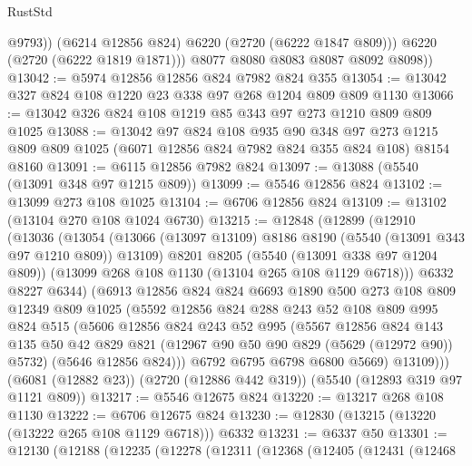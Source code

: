 \begin{lexlean}{RustStd}
\begin{coremodule}
                @9793))
            (@6214 @12856 @824)
            @6220
            (@2720 (@6222 @1847 @809)))
          @6220
          (@2720 (@6222 @1819 @1871)))
        @8077
        @8080
        @8083
        @8087
        @8092
        @8098))
@13042 := @5974 @12856 @12856 @824 @7982 @824 @355
@13054 := @13042 @327 @824 @108 @1220 @23 @338 @97 @268 @1204 @809 @809 @1130
@13066 := @13042 @326 @824 @108 @1219 @85 @343 @97 @273 @1210 @809 @809 @1025
@13088 := @13042
    @97
    @824
    @108
    @935
    @90
    @348
    @97
    @273
    @1215
    @809
    @809
    @1025
    (@6071 @12856 @824 @7982 @824 @355 @824 @108)
    @8154
    @8160
@13091 := @6115 @12856 @7982 @824
@13097 := @13088 (@5540 (@13091 @348 @97 @1215 @809))
@13099 := @5546 @12856 @824
@13102 := @13099 @273 @108 @1025
@13104 := @6706 @12856 @824
@13109 := @13102 (@13104 @270 @108 @1024 @6730)
@13215 := @12848
    (@12899
      (@12910
        (@13036
          (@13054
            (@13066 (@13097 @13109) @8186 @8190 (@5540 (@13091 @343 @97 @1210 @809)) @13109)
            @8201
            @8205
            (@5540 (@13091 @338 @97 @1204 @809))
            (@13099 @268 @108 @1130 (@13104 @265 @108 @1129 @6718)))
          @6332
          @8227
          @6344)
        (@6913
          @12856
          @824
          @824
          @6693
          @1890
          @500
          @273
          @108
          @809
          @12349
          @809
          @1025
          (@5592
            @12856
            @824
            @288
            @243
            @52
            @108
            @809
            @995
            @824
            @515
            (@5606
              @12856
              @824
              @243
              @52
              @995
              (@5567
                @12856
                @824
                @143
                @135
                @50
                @42
                @829
                @821
                (@12967 @90 @50 @90 @829 (@5629 (@12972 @90)) @5732)
                (@5646 @12856 @824)))
            @6792
            @6795
            @6798
            @6800
            @5669)
          @13109)))
    (@6081 (@12882 @23))
    (@2720 (@12886 @442 @319))
    (@5540 (@12893 @319 @97 @1121 @809))
@13217 := @5546 @12675 @824
@13220 := @13217 @268 @108 @1130
@13222 := @6706 @12675 @824
@13230 := @12830 (@13215 (@13220 (@13222 @265 @108 @1129 @6718))) @6332
@13231 := @6337 @50
@13301 := @12130
    (@12188
      (@12235
        (@12278
          (@12311
            (@12368
              (@12405
                (@12431
                  (@12468

\end{coremodule}
\end{lexlean}
